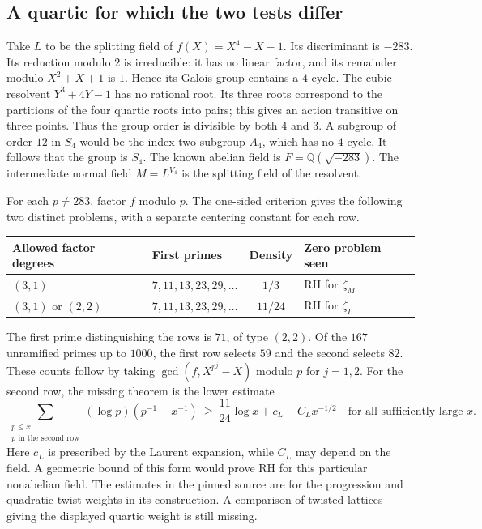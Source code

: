 \subsection{A quartic for which the two tests differ}
Take $L$ to be the splitting field of $f(X)=X^4-X-1$. Its discriminant is $-283$. Its reduction modulo $2$ is irreducible: it has no linear factor, and its remainder modulo $X^2+X+1$ is $1$. Hence its Galois group contains a $4$-cycle. The cubic resolvent $Y^3+4Y-1$ has no rational root. Its three roots correspond to the partitions of the four quartic roots into pairs; this gives an action transitive on three points. Thus the group order is divisible by both $4$ and $3$. A subgroup of order $12$ in $S_4$ would be the index-two subgroup $A_4$, which has no $4$-cycle. It follows that the group is $S_4$. The known abelian field is $F=\mathbb Q(\sqrt{-283})$. The intermediate normal field $M=L^{V_4}$ is the splitting field of the resolvent.

For each $p\ne283$, factor $f$ modulo $p$. The one-sided criterion gives the following two distinct problems, with a separate centering constant for each row.
\begin{center}\small
\begin{tabular}{@{}llcl@{}}\toprule
Allowed factor degrees & First primes & Density & Zero problem seen\\\midrule
$(3,1)$ & $7,11,13,23,29,\ldots$ & $1/3$ & RH for $\zeta_M$\\
$(3,1)$ or $(2,2)$ & $7,11,13,23,29,\ldots$ & $11/24$ & RH for $\zeta_L$\\\bottomrule
\end{tabular}\end{center}
The first prime distinguishing the rows is $71$, of type $(2,2)$. Of the $167$ unramified primes up to $1000$, the first row selects $59$ and the second selects $82$. These counts follow by taking $\gcd(f,X^{p^j}-X)$ modulo $p$ for $j=1,2$. For the second row, the missing theorem is the lower estimate
\[
 \sum_{\substack{p\le x\\p\text{ in the second row}}}
       (\log p)(p^{-1}-x^{-1})
 \ \ge\ \frac {11}{24}\log x+c_L-C_L x^{-1/2}
 \quad\text{for all sufficiently large }x .
\]
Here $c_L$ is prescribed by the Laurent expansion, while $C_L$ may depend on the field. A geometric bound of this form would prove RH for this particular nonabelian field. The estimates in the pinned source are for the progression and quadratic-twist weights in its construction. A comparison of twisted lattices giving the displayed quartic weight is still missing.

